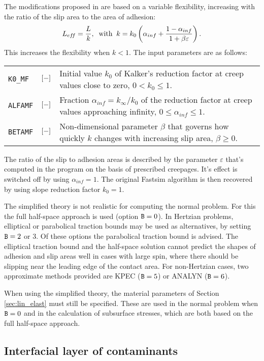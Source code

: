 \documentclass[12pt]{report}
\newenvironment{inputvars}{\vspace{0.4\baselineskip}%

\begin{tabular}{>{\raggedright}p{22mm}p{19mm}p{113mm}}}{
\end{tabular}

}
\newcommand{\inpvar}[3]{{\small\tt #1} & $#2$ & #3 \\[1ex]}
\begin{document}
The modifications proposed in \cite{Spiryagin2013} are based on a variable
flexibility, increasing with the ratio of the slip area to the area
of adhesion:
\begin{equation}
   L_{ef\!f} = \frac{L}{k}, \;\;\mbox{with}\;\;
   k = k_0 \left( \alpha_{inf} + 
                \frac{1-\alpha_{inf}}{1+\beta\varepsilon} \right) .
\end{equation}
This increases the flexibility when $k<1$. The input parameters are as
follows:
\begin{inputvars}
\inpvar{K0\_MF}{\bunit{-}}{Initial value $k_0$ of Kalker's reduction factor at creep
        values close to zero, $0<k_0\le 1$.}
\inpvar{ALFAMF}{\bunit{-}}{Fraction $\alpha_{inf}=k_\infty/k_0$ of the reduction
        factor at creep values approaching infinity, $0\le\alpha_{inf}\le 1$.}
\inpvar{BETAMF}{\bunit{-}}{Non-dimensional parameter $\beta$ that governs how
        quickly $k$ changes with increasing slip area, $\beta\ge 0$.}
\end{inputvars}
The ratio of the slip to adhesion areas is described by the parameter
$\varepsilon$ that's computed in the program on the basis of prescribed
creepages. It's effect is switched off by using $\alpha_{inf}=1$.
The original Fastsim algorithm is then recovered by using slope reduction
factor $k_0=1$.

The simplified theory is not realistic for computing the normal problem.
For this the full half-space approach is used (option ${\tt B}=0$). In
Hertzian problems, elliptical or parabolical traction bounds may be
used as alternatives, by setting ${\tt B}=2$ or 3. Of these options the
parabolical traction bound is advised. The elliptical traction bound and
the half-space solution cannot predict the shapes of adhesion and slip
areas well in cases with large spin, where there should be slipping near
the leading edge of the contact area. For non-Hertzian cases, two
approximate methods provided are KPEC (${\tt B}=5$) or ANALYN (${\tt B}=6$).

When using the simplified theory, the material parameters of Section
\ref{sec:lin_elast} must still be specified. These are used in the normal
problem when ${\tt B}=0$ and in the calculation of subsurface stresses,
which are both based on the full half-space approach.

\subsection{Interfacial layer of contaminants}
\label{sec:intfc_layer}
\end{document}
